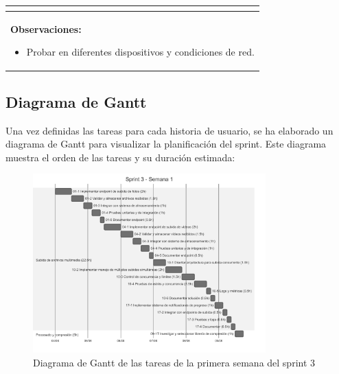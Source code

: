 \begin{table}[H]
\begin{center}
\begin{tabularx}{\textwidth}{|l|X|l|}
{\begin{itemize}
                \end{itemize}
            }\\
            \hline
            \multicolumn{3}{|p{\textwidth}|}{
                \textbf{Observaciones:}
                \begin{itemize}
                    \item Probar en diferentes dispositivos y condiciones de red.
                \end{itemize}
            }\\
            \hline
        \end{tabularx}
    \end{center}
\end{table}

\subsection{Diagrama de Gantt}
Una vez definidas las tareas para cada historia de usuario, se ha elaborado un diagrama de Gantt para visualizar la planificación del sprint. Este diagrama muestra el orden de las tareas y su duración estimada:

\begin{figure}[H]
    \begin{center}
        \includegraphics[width=0.8\textwidth]{assets/sprint3/week1-gantt.png}
    \end{center}
    \caption{Diagrama de Gantt de las tareas de la primera semana del sprint 3}\label{fig:gantt-sprint3-week1}
\end{figure}


